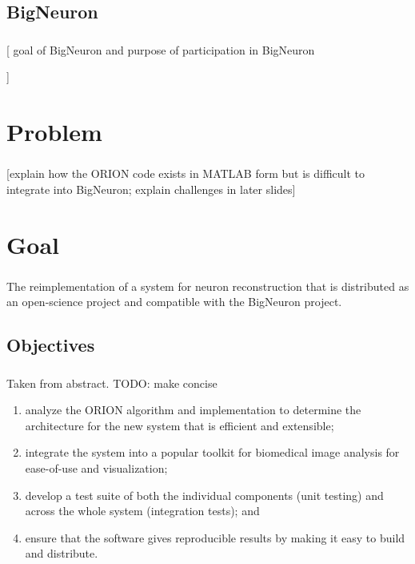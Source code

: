 \documentclass{beamer}
\newcommand{\tbackground}[1]{#1}
\newcommand{\tobjectives}[1]{#1}
\newcommand{\tbackground}[1]{\textcolor{tbackground}{#1}}
\newcommand{\tobjectives}[1]{\textcolor{tobjectives}{#1}}
\begin{document}
\subsection{BigNeuron}
\begin{frame}\frametitle{\subsecname}
	[\tbackground
		{%
			goal of BigNeuron and purpose of participation in
			BigNeuron
		}
	]
\end{frame}

\section{Problem}
\begin{frame}\frametitle{\secname}
	[\tbackground{explain how the ORION code exists in MATLAB form but is difficult to
	integrate into BigNeuron}; explain challenges in later slides]
\end{frame}

\section{Goal}
\begin{frame}\frametitle{\secname}
	\centering
	\tobjectives{%
	The reimplementation of  a system
		for \alert{neuron reconstruction}
		that is distributed as an \alert{open-science} project
		and
		compatible with the \alert{BigNeuron} project.
	}
\end{frame}

\subsection{Objectives}
\begin{frame}\frametitle{\subsecname}
	\tobjectives{%
	Taken from abstract. TODO: make concise
	\begin{enumerate}
		\item analyze the ORION algorithm and implementation to
			determine the architecture for the new system that is
			efficient and extensible;
		\item integrate the system into a popular toolkit for biomedical
			image analysis for ease-of-use and visualization;
		\item develop a test suite of both the individual components (unit
			testing) and across the whole system (integration tests);
			and %
		\item ensure that the software gives reproducible results by
			making it easy to build and distribute. %
	\end{enumerate}
	}
\end{frame}
\end{document}
